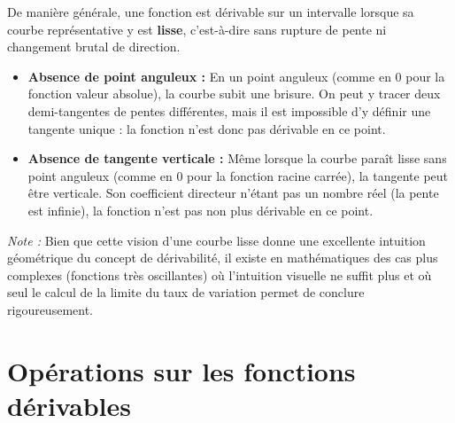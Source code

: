 \begin{rem}

	De manière générale, une fonction est dérivable sur un intervalle lorsque sa courbe représentative y est \textbf{\og lisse\fg{}}, c'est-à-dire sans rupture de pente ni changement brutal de direction.

	\begin{itemize}
		\item \textbf{Absence de point anguleux :} En un point anguleux (comme en $0$ pour la fonction valeur absolue), la courbe subit une \og brisure\fg{}. On peut y tracer deux demi-tangentes de pentes différentes, mais il est impossible d'y définir une tangente unique : la fonction n'est donc pas dérivable en ce point.
		\item \textbf{Absence de tangente verticale :} Même lorsque la courbe paraît lisse sans point anguleux (comme en $0$ pour la fonction racine carrée), la tangente peut être verticale. Son coefficient directeur n'étant pas un nombre réel (la pente est \og infinie\fg{}), la fonction n'est pas non plus dérivable en ce point.
	\end{itemize}

	\textit{Note :} Bien que cette vision d'une courbe \og lisse\fg{} donne une excellente intuition géométrique du concept de dérivabilité, il existe en mathématiques des cas plus complexes (fonctions très oscillantes) où l'intuition visuelle ne suffit plus et où seul le calcul de la limite du taux de variation permet de conclure rigoureusement.
\end{rem}

\section{Opérations sur les fonctions dérivables}

